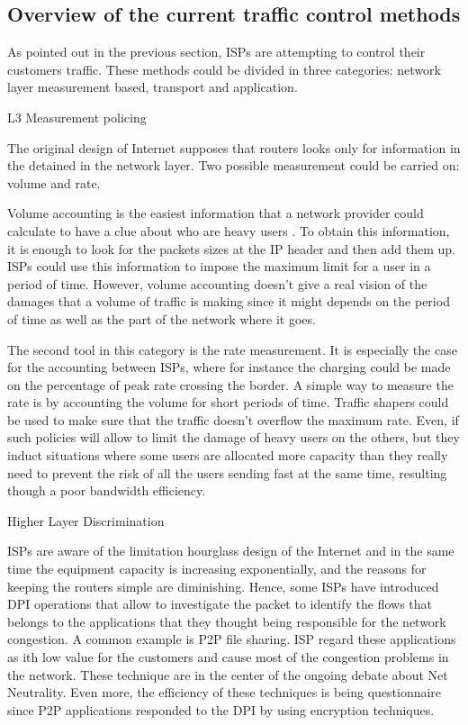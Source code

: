\subsection{Overview of  the current traffic control methods}
As pointed out in the previous section, ISPs are attempting to control their customers traffic. These methods could be divided in three categories: network layer measurement based, transport and application.

L3 Measurement policing

The original design of Internet supposes that routers looks only for information in the detained in the network layer. Two possible measurement could be carried on: volume and rate.

Volume accounting is the easiest information that a network provider could calculate to have a clue about who are heavy users . To obtain this information, it is enough to look for the packets sizes at the IP header and then add them up. ISPs could use this information to impose the maximum limit for a user in a period of time. However, volume accounting doesn't give a real vision of the damages that a volume of traffic is making since it might depends on the period of time as well as the part of the network where it goes.

The second tool in this category is the rate measurement. It is especially the case for the accounting between ISPs, where for instance the charging could be made on the percentage of peak rate crossing the border. A simple way to measure the rate is by accounting the volume for short periods of  time. Traffic shapers could be used to make sure that the traffic doesn't overflow the maximum rate. Even, if such policies will allow to limit the damage of heavy users on the others, but they induct situations where some users are allocated more capacity than they really need to prevent the risk of all the users sending fast at the same time, resulting though a poor bandwidth efficiency.

Higher Layer Discrimination

ISPs are aware of the limitation hourglass design of the Internet and in the same time the equipment capacity is increasing exponentially, and the reasons for keeping the routers simple are diminishing. Hence, some ISPs have introduced DPI operations that allow to investigate the packet to identify the flows that belongs to the applications that they thought being responsible for the network congestion. A common example is P2P file sharing. ISP regard these applications as ith low value for the customers and cause most of the congestion problems in the network. These technique are in the center of the ongoing debate about Net Neutrality. Even more, the efficiency of these techniques is being questionnaire since P2P applications 
responded to the DPI by using encryption techniques.

